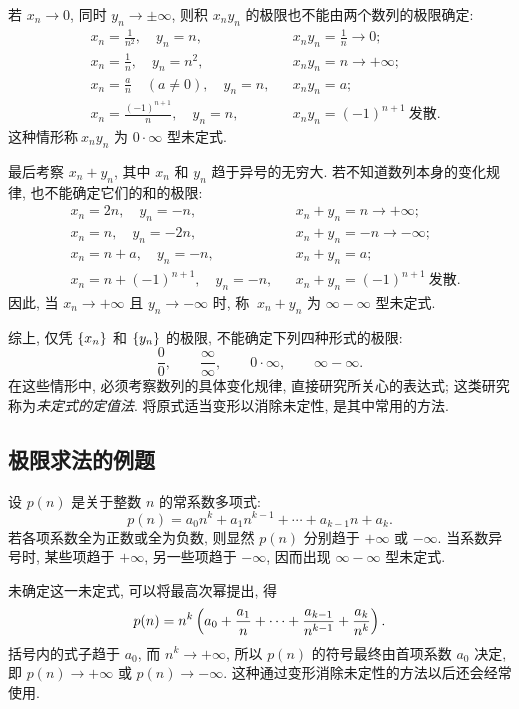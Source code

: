 \myrefparagraph{3\textdegree}\label{form:zero_times_infinity}
若 $x_n\to0$, 同时 $y_n\to\pm\infty$, 则积 $x_ny_n$ 的极限也不能由两个数列的极限确定:
\begin{align*}
&x_n=\frac{1}{n^2},\quad y_n=n,
&&x_ny_n=\frac{1}{n}\to0;\\
&x_n=\frac{1}{n},\quad y_n=n^2,
&&x_ny_n=n\to+\infty;\\
&x_n=\frac{a}{n}\quad(a\neq0),\quad y_n=n,
&&x_ny_n=a;\\
&x_n=\frac{(-1)^{n+1}}{n},\quad y_n=n,
&&x_ny_n=(-1)^{n+1}\ \text{发散}.
\end{align*}
这种情形称{\kaishu $\ x_n y_n$ 为 $0\cdot\infty$ 型未定式.}

\myrefparagraph{4\textdegree}\label{form:infinity_minus_infinity}
最后考察 $x_n+y_n$, 其中 $x_n$ 和 $y_n$ 趋于异号的无穷大.
若不知道数列本身的变化规律, 也不能确定它们的和的极限:
\begin{align*}
&x_n=2n,\quad y_n=-n,
&&x_n+y_n=n\to+\infty;\\
&x_n=n,\quad y_n=-2n,
&&x_n+y_n=-n\to-\infty;\\
&x_n=n+a,\quad y_n=-n,
&&x_n+y_n=a;\\
&x_n=n+(-1)^{n+1},\quad y_n=-n,
&&x_n+y_n=(-1)^{n+1}\ \text{发散}.
\end{align*}
因此, 当 $x_n\to+\infty$ 且 $y_n\to-\infty$ 时, 称 {\kaishu $\ x_n+y_n$ 为
$\infty-\infty$ 型未定式.}

综上, 仅凭 $\{x_{n}\}$ 和 $\{y_{n}\}$ 的极限, 不能确定下列四种形式的极限:
$$
\frac{0}{0},\qquad \frac{\infty}{\infty},\qquad
0\cdot\infty,\qquad \infty-\infty.
$$
在这些情形中, 必须考察数列的具体变化规律, 直接研究所关心的表达式;
这类研究称为\emph{未定式的定值法}. 将原式适当变形以消除未定性, 是其中常用的方法.

\subsection{极限求法的例题}\label{subsec:32}
\label{ex:polynomial_limit}
设 $p(n)$ 是关于整数 $n$ 的常系数多项式:
$$
p(n)=a_0n^k+a_1n^{k-1}+\cdots+a_{k-1}n+a_k.
$$
若各项系数全为正数或全为负数, 则显然 $p(n)$ 分别趋于 $+\infty$ 或 $-\infty$.
当系数异号时, 某些项趋于 $+\infty$, 另一些项趋于 $-\infty$, 因而出现
$\infty-\infty$ 型未定式.

未确定这一未定式, 可以将最高次幂提出, 得
$$
p(n)=n^k\left( a_0+\frac{a_1}{n}+\cdots+
\frac{a_{k-1}}{n^{k-1}}+\frac{a_k}{n^k} \right).
$$
括号内的式子趋于 $a_0$, 而 $n^k\to+\infty$, 所以 $p(n)$ 的符号最终由首项系数
$a_0$ 决定, 即 $p(n)\to+\infty$ 或 $p(n)\to-\infty$.
这种通过变形消除未定性的方法以后还会经常使用.

